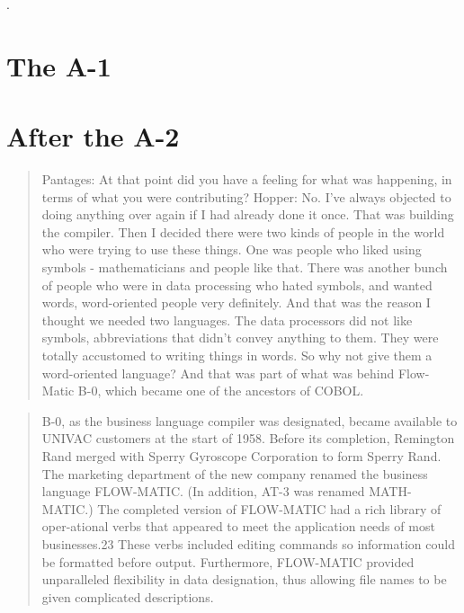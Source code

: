 .
\section{The A-1}


\section{After the A-2}

\begin{quotation}
Pantages: At that point did you have a feeling for what was happening, in terms of what you
were contributing?
Hopper: No. I've always objected to doing anything over again if I had already done it
once. That was building the compiler. Then I decided there were two kinds of people in the
world who were trying to use these things. One was people who liked using symbols -
mathematicians and people like that. There was another bunch of people who were in data
processing who hated symbols, and wanted words, word-oriented people very definitely. And
that was the reason I thought we needed two languages.
The data processors did not like symbols, abbreviations that didn't convey anything to them.
They were totally accustomed to writing things in words. So why not give them a word-oriented
language? And that was part of what was behind Flow-Matic B-0, which became one of the
ancestors of COBOL.
\end{quotation}


\begin{quotation}
B-0, as the business language compiler was designated, became available to 
UNIVAC customers at the start of 1958. Before its completion, Remington Rand 
merged with Sperry Gyroscope Corporation to form Sperry Rand. The marketing 
department of the new company renamed the business language FLOW-MATIC. (In 
addition, AT-3 was renamed MATH-MATIC.) The completed version of FLOW-MATIC had 
a rich library of oper-ational verbs that appeared to meet the application 
needs of most businesses.23 These verbs included editing commands so 
information could be formatted before output. Furthermore, FLOW-MATIC provided 
unparalleled flexibility in data designation, thus allowing file names to be 
given complicated descriptions.
\end{quotation}

